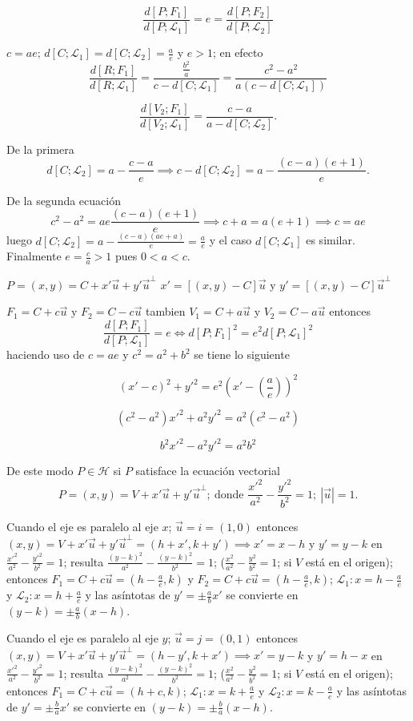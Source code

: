 \documentclass[12pt,]{report}
\theoremstyle{slplain}
\begin{document}
\[\frac{d\left[P;F_1\right]}{d\left[P;\mathcal{L}_1\right]}=e=\frac{d\left[P;F_2\right]}{d\left[P;\mathcal{L}_2\right]}\]

\(c=ae\); \(d\left[C;\mathcal{L}_1\right]=d\left[C;\mathcal{L}_2\right]=\frac{a}{e}\) y \(e>1\); en efecto \[\frac{d\left[R;F_1\right]}{d\left[R;\mathcal{L}_1\right]}=\frac{\frac{b^2}{a}}{c-d\left[C;\mathcal{L}_1\right]}=\frac{c^2-a^2}{a(c-d\left[C;\mathcal{L}_1\right])}\]

\[\frac{d\left[V_2;F_1\right]}{d\left[V_2;\mathcal{L}_1\right]}=\frac{c-a}{a-d\left[C;\mathcal{L}_2\right]}.\]

De la primera \[d\left[C;\mathcal{L}_2\right]=a-\frac{c-a}{e}\implies c-d\left[C;\mathcal{L}_2\right]=a-\frac{(c-a)(e+1)}{e}.\]

De la segunda ecuación \[c^2-a^2=ae\frac{(c-a)(e+1)}{e}\implies c+a=a(e+1)\implies c=ae\] luego \(d\left[C;\mathcal{L}_2\right]=a-\frac{(c-a)(ae+a)}{e}=\frac{a}{e}\) y el caso \(d\left[C;\mathcal{L}_1\right]\) es similar. Finalmente \(e=\frac{c}{a}>1\) pues \(0<a<c.\)

\(P=(x,y)=C+x'\vec{u}+y'\vec{u}^\perp\) \(x'=[(x,y)-C]\vec{u}\) y \(y'=[(x,y)-C]\vec{u}^\perp\)

\(F_1=C+c\vec{u}\) y \(F_2=C-c\vec{u}\) tambien \(V_1=C+a\vec{u}\) y \(V_2=C-a\vec{u}\) entonces \[\frac{d\left[P;F_1\right]}{d\left[P;\mathcal{L}_1\right]}=e\iff d\left[P;F_1\right]^2=e^2d\left[P;\mathcal{L}_1\right]^2\] haciendo uso de \(c=ae\) y \(c^2=a^2+b^2\) se tiene lo siguiente

\[(x'-c)^2+y'^2=e^2\left(x'-\left(\frac{a}{e}\right)\right)^2\]

\[(c^2-a^2) x'^2+a^2y'^2=a^2(c^2-a^2)\]

\[b^2x'^2-a^2y'^2=a^2b^2\]

De este modo \(P\in\mathcal{H}\) si \(P\) satisface la ecuación vectorial \[P=(x,y)=V+x'\vec{u}+y'\vec{u}^\perp;\: \text{donde } \frac{x'^2}{a^2}-\frac{y'^2}{b^2}=1; \:\left|\vec{u}\right|=1.\]

Cuando el eje es paralelo al eje \(x\); \(\vec{u}=i=(1,0)\) entonces \((x,y)=V+x'\vec{u}+y'\vec{u}^\perp=(h+x',k+y')\implies x'=x-h\) y \(y'=y-k\) en \(\frac{x'^2}{a^2}-\frac{y'^2}{b^2}=1\); resulta \(\frac{(y-k)^2}{a^2}-\frac{(y-k)^2}{b^2}=1\); (\(\frac{x^2}{a^2}-\frac{y^2}{b^2}=1\); si \(V\) está en el origen); entonces \(F_1=C+c\vec{u}=(h-\frac{a}{e},k)\) y \(F_2=C+c\vec{u}=(h-\frac{a}{e},k)\); \(\mathcal{L}_1: x=h-\frac{a}{e}\) y \(\mathcal{L}_2: x=h+\frac{a}{e}\) y las asíntotas de \(y'=\pm\frac{a}{b}x'\) se convierte en \((y-k)=\pm\frac{a}{b}(x-h)\).

Cuando el eje es paralelo al eje \(y\); \(\vec{u}=j=(0,1)\) entonces \((x,y)=V+x'\vec{u}+y'\vec{u}^\perp=(h-y',k+x')\implies x'=y-k\) y \(y'=h-x\) en \(\frac{x'^2}{a^2}-\frac{y'^2}{b^2}=1\); resulta \(\frac{(y-k)^2}{a^2}-\frac{(y-k)^2}{b^2}=1\); (\(\frac{x^2}{a^2}-\frac{y^2}{b^2}=1\); si \(V\) está en el origen); entonces \(F_1=C+c\vec{u}=(h+c,k)\); \(\mathcal{L}_1: x=k+\frac{a}{e}\) y \(\mathcal{L}_2: x=k-\frac{a}{e}\) y las asíntotas de \(y'=\pm\frac{b}{a}x'\) se convierte en \((y-k)=\pm\frac{b}{a}(x-h)\).


\end{document}
